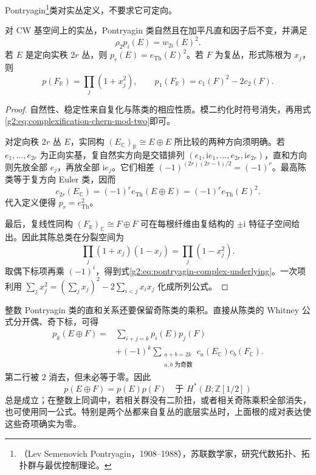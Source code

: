 Pontryagin\footnote{（Lev Semenovich Pontryagin，1908--1988），苏联数学家，研究代数拓扑、拓扑群与最优控制理论。}类对实丛定义，不要求它可定向。

\begin{proposition}\label{g2:prop:pontryagin-properties}
	对 CW 基空间上的实丛，Pontryagin 类自然且在加平凡直和因子后不变，并满足
	\[
		\rho_2p_i(E)=w_{2i}(E)^2.
	\]
	若 \(E\) 是定向实秩 \(2r\) 丛，则 \(p_r(E)=e_{\mathrm{Th}}(E)^2\)。若 \(F\) 为复丛，形式陈根为 \(x_j\)，则
	\begin{equation}\label{g2:eq:pontryagin-complex-underlying}
		p(F_{\mathbb R})=\prod_j(1+x_j^2),\qquad
		p_1(F_{\mathbb R})=c_1(F)^2-2c_2(F).
	\end{equation}
\end{proposition}
\begin{proof}
	自然性、稳定性来自复化与陈类的相应性质。模二约化时符号消失，再用式\eqref{g2:eq:complexification-chern-mod-two}即可。

	对定向秩 \(2r\) 丛 \(E\)，实同构 \((E_{\mathbb C})_{\mathbb R}\cong E\oplus E\) 所比较的两种方向须明确。若 \(e_1,\ldots,e_{2r}\) 为正向实基，复自然实方向是交错排列 \((e_1,\mathrm i e_1,\ldots,e_{2r},\mathrm i e_{2r})\)，直和方向则先放全部 \(e_j\)，再放全部 \(\mathrm i e_j\)。它们相差 \((-1)^{(2r)(2r-1)/2}=(-1)^r\)。最高陈类等于复方向 Euler 类，因而
	\[
		c_{2r}(E_{\mathbb C})=(-1)^re_{\mathrm{Th}}(E\oplus E)=(-1)^re_{\mathrm{Th}}(E)^2.
	\]
	代入定义便得 \(p_r=e_{\mathrm{Th}}^2\)。

	最后，复线性同构 \((F_{\mathbb R})_{\mathbb C}\cong F\oplus\overline F\) 可在每根纤维由复结构的 \(\pm\mathrm i\) 特征子空间给出。因此其陈总类在分裂空间为
	\[
		\prod_j(1+x_j)(1-x_j)=\prod_j(1-x_j^2).
	\]
	取偶下标项再乘 \((-1)^i\)，得到式\eqref{g2:eq:pontryagin-complex-underlying}。一次项利用 \(\sum_jx_j^2=(\sum_jx_j)^2-2\sum_{i<j}x_ix_j\) 化成所列公式。
\end{proof}

整数 Pontryagin 类的直和关系还要保留奇陈类的乘积。直接从陈类的 Whitney 公式分开偶、奇下标，可得
\begin{equation}\label{g2:eq:pontryagin-sum-torsion}
	\begin{split}
		p_k(E\oplus F)={}&\sum_{i+j=k}p_i(E)p_j(F)\\
		&+(-1)^k\!\sum_{\substack{a+b=2k\\a,b\text{ 为奇数}}}c_a(E_{\mathbb C})c_b(F_{\mathbb C}).
	\end{split}
\end{equation}
第二行被 \(2\) 消去，但未必等于零。因此
\[
	p(E\oplus F)=p(E)p(F)\quad\text{于 }H^*(B;\mathbb Z[1/2])
\]
总是成立；在整数上同调中，若相关群没有二阶扭，或者相关奇陈乘积全部消失，也可使用同一公式。特别是两个丛都来自复丛的底层实丛时，上面根的成对表达使这些奇项确实为零。

